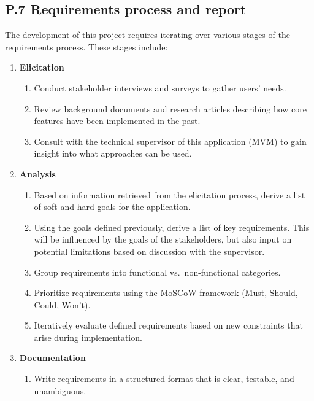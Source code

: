 \documentclass[12pt]{article}
\theoremstyle{definition}
\begin{document}
\subsection{P.7 Requirements process and report}
The development of this project requires iterating over various stages of the
requirements process. These stages include:

\begin{enumerate}
    \item \textbf{Elicitation}
    \begin{enumerate}
        \item Conduct stakeholder interviews and surveys to gather users' needs.

        \item Review background documents and research articles describing how
        core features have been implemented in the past.

        \item Consult with the technical supervisor of this application
        (\hyperref[itm:domain-experts]{MVM}) to gain insight into what
        approaches can be used. 
    \end{enumerate}

    \item \textbf{Analysis}
    \begin{enumerate}
        \item Based on information retrieved from the elicitation process,
        derive a list of soft and hard goals for the application.

        \item Using the goals defined previously, derive a list of key
        requirements. This will be influenced by the goals of the stakeholders,
        but also input on potential limitations based on discussion with the
        supervisor.

        \item Group requirements into functional vs.\ non-functional categories.

        \item Prioritize requirements using the MoSCoW framework (Must, Should,
        Could, Won't).

        \item Iteratively evaluate defined requirements based on new constraints
        that arise during implementation. 
    \end{enumerate}

    \item \textbf{Documentation}
    \begin{enumerate}
        \item Write requirements in a structured format that is clear, testable,
        and unambiguous.


\end{enumerate}
\end{enumerate}
\end{document}
